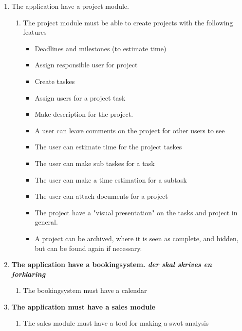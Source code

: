 \begin{enumerate}
\begin{enumerate}
\begin{enumerate}
            \item The application have a project module.
            \begin{enumerate}
                \item The project module must be able to create projects with the following features
                \begin{itemize}\textbf{\textit{skal skrives om til flydende tekst}}
                    \item Deadlines and milestones (to estimate time)
                    \item Assign responsible user for project
                    \item Create taskes
                    \item Assign users for a project task
                    \item Make description for the project.
                    \item A user can leave comments on the project for other users to see
                    \item The user can estimate time for the project taskes
                    \item The user can make sub taskes for a task
                    \item The user can make a time estimation for a subtask
                    \item The user can attach documents for a project
                    \item The project have a "visual presentation" on the tasks and project in general.
                    \item A project can be archived, where it is seen as complete, and hidden, but can be found again if necessary.
                \end{itemize}
            \end{enumerate}
            \item \textbf{The application have a bookingsystem. \textit{der skal skrives en forklaring}} 
            \begin{enumerate}
                \item The bookingsystem must have a calendar
            \end{enumerate}
            \item \textbf{The application must have a sales module}
            \begin{enumerate}
                \item The sales module must have a tool for making a swot analysis

\end{enumerate}
\end{enumerate}
\end{enumerate}
\end{enumerate}
